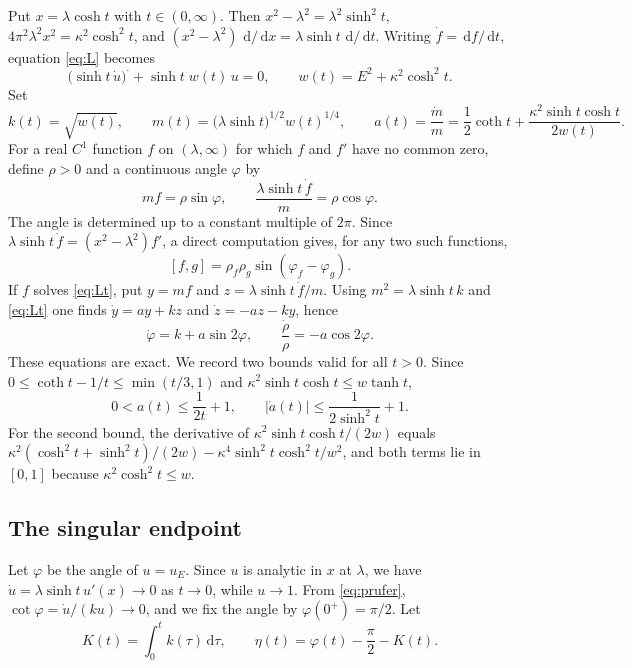 \documentclass[11pt]{amsart}
\theoremstyle{definition}
\newcommand{\dd}{\,\mathrm{d}}
\begin{document}
Put $x=\lambda\cosh t$ with $t\in(0,\infty)$. Then $x^2-\lambda^2=\lambda^2\sinh^2t$, $4\pi^2\lambda^2x^2=\kappa^2\cosh^2t$, and $(x^2-\lambda^2)\,\dd/\dd x=\lambda\sinh t\,\dd/\dd t$. Writing $\dot f=\dd f/\dd t$, equation \eqref{eq:L} becomes
\begin{equation}\label{eq:Lt}
\big(\sinh t\,\dot u\big)^{\boldsymbol\cdot}+\sinh t\;w(t)\,u=0,\qquad w(t)=E^2+\kappa^2\cosh^2t .
\end{equation}
Set
\[
k(t)=\sqrt{w(t)},\qquad m(t)=\big(\lambda\sinh t\big)^{1/2}w(t)^{1/4},\qquad a(t)=\frac{\dot m}{m}=\frac12\coth t+\frac{\kappa^2\sinh t\cosh t}{2w(t)} .
\]
For a real $C^1$ function $f$ on $(\lambda,\infty)$ for which $f$ and $f'$ have no common zero, define $\rho>0$ and a continuous angle $\varphi$ by
\begin{equation}\label{eq:prufer}
m f=\rho\sin\varphi,\qquad \frac{\lambda\sinh t\,\dot f}{m}=\rho\cos\varphi .
\end{equation}
The angle is determined up to a constant multiple of $2\pi$. Since $\lambda\sinh t\,\dot f=(x^2-\lambda^2)f'$, a direct computation gives, for any two such functions,
\begin{equation}\label{eq:wronskian}
[f,g]=\rho_f\rho_g\sin(\varphi_f-\varphi_g).
\end{equation}
If $f$ solves \eqref{eq:Lt}, put $y=mf$ and $z=\lambda\sinh t\,\dot f/m$. Using $m^2=\lambda\sinh t\,k$ and \eqref{eq:Lt} one finds $\dot y=a y+k z$ and $\dot z=-a z-k y$, hence
\begin{equation}\label{eq:phase}
\dot\varphi=k+a\sin2\varphi,\qquad \frac{\dot\rho}{\rho}=-a\cos2\varphi .
\end{equation}
These equations are exact. We record two bounds valid for all $t>0$. Since $0\le\coth t-1/t\le\min(t/3,1)$ and $\kappa^2\sinh t\cosh t\le w\tanh t$,
\begin{equation}\label{eq:abound}
0<a(t)\le\frac{1}{2t}+1,\qquad |\dot a(t)|\le\frac{1}{2\sinh^2t}+1 .
\end{equation}
For the second bound, the derivative of $\kappa^2\sinh t\cosh t/(2w)$ equals $\kappa^2(\cosh^2t+\sinh^2t)/(2w)-\kappa^4\sinh^2t\cosh^2t/w^2$, and both terms lie in $[0,1]$ because $\kappa^2\cosh^2t\le w$.

\subsection{The singular endpoint}
Let $\varphi$ be the angle of $u=u_E$. Since $u$ is analytic in $x$ at $\lambda$, we have $\dot u=\lambda\sinh t\,u'(x)\to0$ as $t\to0$, while $u\to1$. From \eqref{eq:prufer}, $\cot\varphi=\dot u/(k u)\to0$, and we fix the angle by $\varphi(0^+)=\pi/2$. Let
\[
K(t)=\int_0^tk(\tau)\dd\tau,\qquad \eta(t)=\varphi(t)-\frac\pi2-K(t).
\]
\end{document}
